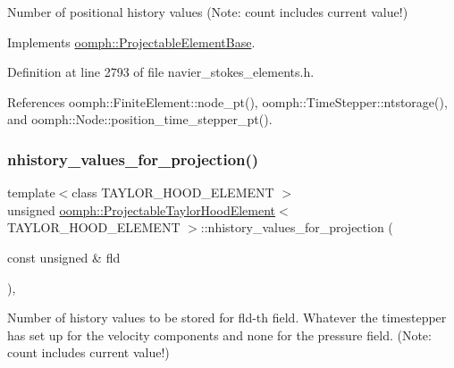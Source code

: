 Number of positional history values (Note\+: count includes current value!) 



Implements \hyperlink{classoomph_1_1ProjectableElementBase_ab4ecd0cd24000a3ed675dc7198203c1f}{oomph\+::\+Projectable\+Element\+Base}.



Definition at line 2793 of file navier\+\_\+stokes\+\_\+elements.\+h.



References oomph\+::\+Finite\+Element\+::node\+\_\+pt(), oomph\+::\+Time\+Stepper\+::ntstorage(), and oomph\+::\+Node\+::position\+\_\+time\+\_\+stepper\+\_\+pt().

\mbox{\label{classoomph_1_1ProjectableTaylorHoodElement_a5d64cb39e6ae0e286c08cbb6c84bcaeb}} 
\subsubsection{\texorpdfstring{nhistory\+\_\+values\+\_\+for\+\_\+projection()}{nhistory\_values\_for\_projection()}}
{\footnotesize\ttfamily template$<$class T\+A\+Y\+L\+O\+R\+\_\+\+H\+O\+O\+D\+\_\+\+E\+L\+E\+M\+E\+NT $>$ \\
unsigned \hyperlink{classoomph_1_1ProjectableTaylorHoodElement}{oomph\+::\+Projectable\+Taylor\+Hood\+Element}$<$ T\+A\+Y\+L\+O\+R\+\_\+\+H\+O\+O\+D\+\_\+\+E\+L\+E\+M\+E\+NT $>$\+::nhistory\+\_\+values\+\_\+for\+\_\+projection (\begin{DoxyParamCaption}\item[{const unsigned \&}]{fld }\end{DoxyParamCaption})\hspace{0.3cm}{\ttfamily [inline]}, {\ttfamily [virtual]}}



Number of history values to be stored for fld-\/th field. Whatever the timestepper has set up for the velocity components and none for the pressure field. (Note\+: count includes current value!) 



